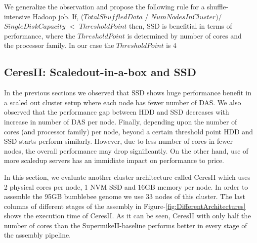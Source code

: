 \documentclass[conference]{IEEEtran}
\begin{document}
We generalize the observation and propose the following rule for a shuffle-intensive Hadoop job.
If,  
($TotalShuffledData$ / $NumNodesInCluster$)/ $SingleDiskCapacity$ $<$ $ThresholdPoint $
then, SSD is benefitial in terms of performance, where the $ThresholdPoint$ is determined by number of cores and the processor family. In our case the $ThresholdPoint$ is 4

\subsection {CeresII: Scaledout-in-a-box and SSD} \label{CeresII:Scaledout-in-a-boxAndSSD}
In the previous sections we observed that SSD shows huge performance benefit in a scaled out cluster setup where each node has fewer number of DAS.
We also observed that the performance gap between HDD and SSD decreases with increase in number of DAS per node.
Finally, depending upon the number of cores (and processor family) per node, beyond a certain threshold point HDD and SSD starts perform similarly.
However, due to less number of cores in fewer nodes, the overall performance may drop significantly. On the other hand, use of more scaledup servers has an immidiate impact on performance to price.

In this section, we evaluate another cluster architecture called CeresII which uses 2 physical cores per node, 1 NVM SSD and 16GB memory per node.  In order to assemble the 95GB bumblebee genome we use 33 nodes of this cluster.
The last columns of different stages of the assembly in Figure-\ref{fig:DifferentArchitectures} shows the execution time of CeresII.
As it can be seen, CeresII with only half the number of cores than the SupermikeII-baseline performs better in every stage of the assembly pipeline.

\end{document}
